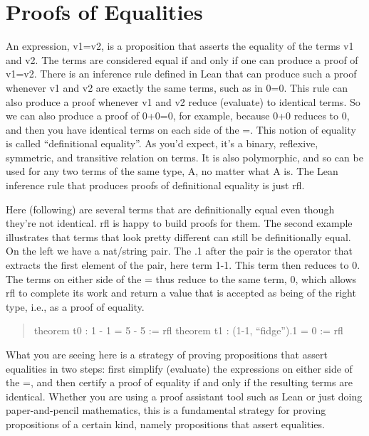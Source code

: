 \documentclass[letterpaper,10pt,english]{sphinxmanual}
\begin{document}
\chapter{Proofs of Equalities}
\label{\detokenize{16-equality:proofs-of-equalities}}\label{\detokenize{16-equality::doc}}
An expression, v1=v2, is a proposition that asserts the equality of
the terms v1 and v2.  The terms are considered equal if and only if
one can produce a proof of v1=v2. There is an inference rule defined
in Lean that can produce such a proof whenever v1 and v2 are exactly
the same terms, such as in 0=0.  This rule can also produce a proof
whenever v1 and v2 reduce (evaluate) to identical terms. So we can
also produce a proof of 0+0=0, for example, because 0+0 reduces to 0,
and then you have identical terms on each side of the =. This notion
of equality is called “definitional equality”. As you’d expect, it’s a
binary, reflexive, symmetric, and transitive relation on terms. It is
also polymorphic, and so can be used for any two terms of the same
type, A, no matter what A is. The Lean inference rule that produces
proofs of definitional equality is just rfl.

Here (following) are several terms that are definitionally equal even
though they’re not identical. rfl is happy to build proofs for
them. The second example illustrates that terms that look pretty
different can still be definitionally equal. On the left we have a
nat/string pair. The .1 after the pair is the operator that extracts
the first element of the pair, here term 1-1. This term then reduces
to 0. The terms on either side of the = thus reduce to the same term,
0, which allows rfl to complete its work and return a value that is
accepted as being of the right type, i.e., as a proof of equality.
\begin{quote}

theorem t0 : 1 - 1 = 5 - 5 := rfl
theorem t1 : (1-1, “fidge”).1 = 0 := rfl
\end{quote}

What you are seeing here is a strategy of proving propositions that
assert equalities in two steps: first simplify (evaluate) the
expressions on either side of the =, and then certify a proof of
equality if and only if the resulting terms are identical.  Whether
you are using a proof assistant tool such as Lean or just doing
paper-and-pencil mathematics, this is a fundamental strategy for
proving propositions of a certain kind, namely propositions that
assert equalities.
\end{document}
